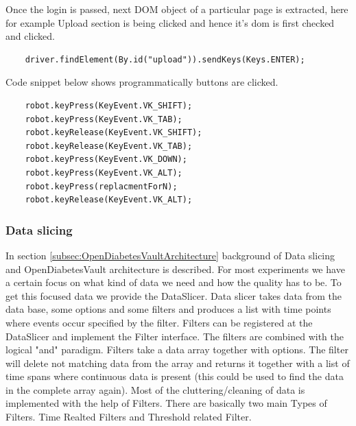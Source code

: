 \documentclass[article,type=msc,colorback,accentcolor=tud9c,twoside,11pt]{tudthesis}
\begin{document}
	Once the login is passed, next DOM object of a particular page is extracted, here for example Upload section is being clicked and hence it's dom is first checked and clicked.
	\begin{lstlisting}
	driver.findElement(By.id("upload")).sendKeys(Keys.ENTER);
	\end{lstlisting}
	Code snippet below shows programmatically buttons are clicked.
	\begin{lstlisting}
	robot.keyPress(KeyEvent.VK_SHIFT);
	robot.keyPress(KeyEvent.VK_TAB);
	robot.keyRelease(KeyEvent.VK_SHIFT);
	robot.keyRelease(KeyEvent.VK_TAB);
	robot.keyPress(KeyEvent.VK_DOWN);
	robot.keyPress(KeyEvent.VK_ALT);
	robot.keyPress(replacmentForN);
	robot.keyRelease(KeyEvent.VK_ALT);	
	\end{lstlisting}
	
	
	\subsubsection{Data slicing}
	In section \ref{subsec:OpenDiabetesVaultArchitecture} background of Data slicing and OpenDiabetesVault architecture is described. For most experiments we have a certain focus on what kind of data we need and how the quality has to be. To get this focused data we provide the DataSlicer. Data slicer takes data from the data base, some options and some filters and produces a list with time points where events occur specified by the filter. Filters can be registered at the DataSlicer and implement the Filter interface. The filters are combined with the logical "and" paradigm. Filters take a data array together with options. The filter will delete not matching data from the array and returns it together with a list of time spans where continuous data is present (this could be used to find the data in the complete array again).  Most of the cluttering/cleaning of data is implemented with the help of Filters. There are basically two main Types of Filters. Time Realted Filters and Threshold related Filter.
	
\end{document}

